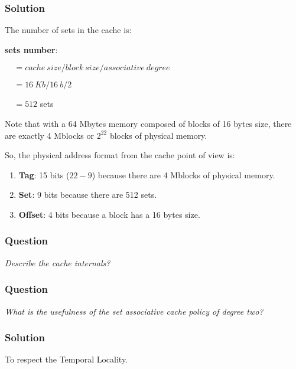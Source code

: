 \begin{frame}
  \frametitle{Solution}

  The number of sets in the cache is:

  \-

  \textbf{sets number}:

  $~~~~~= cache~size / block~size / associative~degree$

  $~~~~~= 16~Kb / 16~b / 2$

  $~~~~~= 512$ sets

  \-

  Note that with a 64 Mbytes memory composed of blocks of 16 bytes size,
  there are exactly 4 Mblocks or $2^{22}$ blocks of physical memory.

  \-

  So, the physical address format from the cache point of view is:

  \begin{enumerate}
    \item
      \textbf{Tag}: 15 bits ($22 - 9$) because there are 4 Mblocks of
      physical memory.
    \item
      \textbf{Set}: 9 bits because there are 512 sets.
    \item
      \textbf{Offset}: 4 bits because a block has a 16 bytes size.
  \end{enumerate}
\end{frame}


\begin{frame}
  \frametitle{Question}

  \textit{Describe the cache internals?}
\end{frame}


\begin{frame}
  \frametitle{Question}

  \textit{What is the usefulness of the set associative cache policy
    of degree two?}
\end{frame}


\begin{frame}
  \frametitle{Solution}

  To respect the Temporal Locality.
\end{frame}


